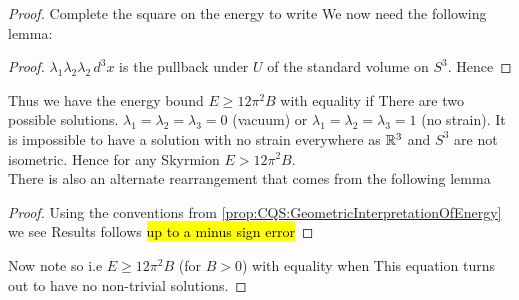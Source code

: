 \documentclass{article}
\begin{document}
\begin{proof}
Complete the square on the energy to write 
We now need the following lemma:
\begin{lemma}
\end{lemma}
\begin{proof}
$\lambda_1 \lambda_2 \lambda_2 \, d^3x$ is the pullback under $U$ of the standard volume on $S^3$. Hence 
\end{proof}
Thus we have the energy bound $E \geq 12\pi^2 B$ with equality if 
There are two possible solutions. $\lambda_1 = \lambda_2 = \lambda_3 = 0$ (vacuum) or $\lambda_1 = \lambda_2 = \lambda_3 = 1$ (no strain). It is impossible to have a solution with no strain everywhere as $\mathbb{R}^3$ and $S^3$ are not isometric. Hence for any Skyrmion $E > 12\pi^2 B$. \\
\newline
There is also an alternate rearrangement that comes from the following lemma 
\begin{lemma}
\end{lemma}
\begin{proof}
Using the conventions from \ref{prop:CQS:GeometricInterpretationOfEnergy} we see 
Results follows \hl{up to a minus sign error}
\end{proof}
Now note 
so 
i.e $E \geq 12 \pi^2 B$ (for $B>0$) with equality when 
This equation turns out to have no non-trivial solutions. 
\end{proof}
\end{document}
